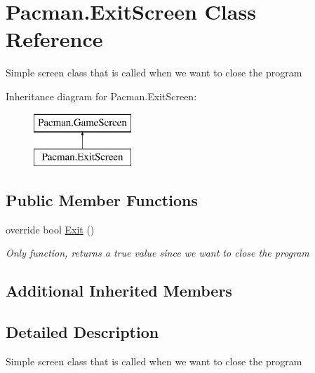 \hypertarget{class_pacman_1_1_exit_screen}{\section{Pacman.\-Exit\-Screen Class Reference}
\label{class_pacman_1_1_exit_screen}
}


Simple screen class that is called when we want to close the program  


Inheritance diagram for Pacman.\-Exit\-Screen\-:\begin{figure}[H]
\begin{center}
\leavevmode
\includegraphics[height=2.000000cm]{class_pacman_1_1_exit_screen}
\end{center}
\end{figure}
\subsection*{Public Member Functions}
\begin{DoxyCompactItemize}
\item 
override bool \hyperlink{class_pacman_1_1_exit_screen_a4177058f3accaa1a45c4ca9599952b16}{Exit} ()
\begin{DoxyCompactList}\small\item\em Only function, returns a true value since we want to close the program \end{DoxyCompactList}\end{DoxyCompactItemize}
\subsection*{Additional Inherited Members}


\subsection{Detailed Description}
Simple screen class that is called when we want to close the program 



